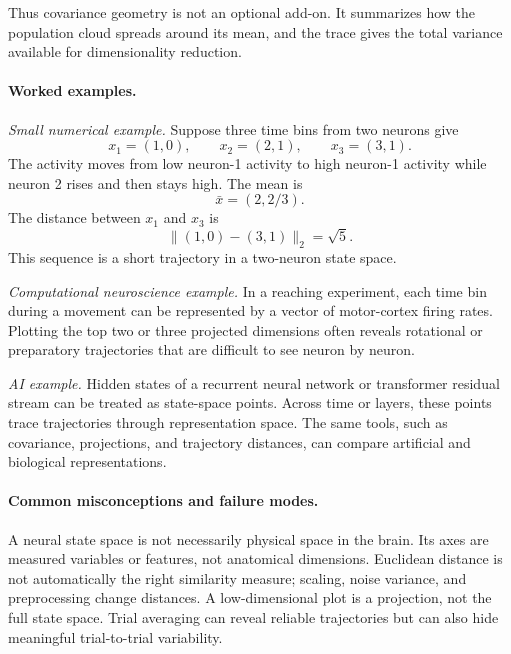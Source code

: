 Thus covariance geometry is not an optional add-on. It summarizes how the population cloud spreads around its mean, and the trace gives the total variance available for dimensionality reduction.

\paragraph{Worked examples.}
\emph{Small numerical example.}
Suppose three time bins from two neurons give
\[
x_1=(1,0),\qquad x_2=(2,1),\qquad x_3=(3,1).
\]
The activity moves from low neuron-1 activity to high neuron-1 activity while neuron 2 rises and then stays high. The mean is
\[
\bar x=(2,2/3).
\]
The distance between \(x_1\) and \(x_3\) is
\[
\|(1,0)-(3,1)\|_2=\sqrt{5}.
\]
This sequence is a short trajectory in a two-neuron state space.

\emph{Computational neuroscience example.}
In a reaching experiment, each time bin during a movement can be represented by a vector of motor-cortex firing rates. Plotting the top two or three projected dimensions often reveals rotational or preparatory trajectories that are difficult to see neuron by neuron.

\emph{AI example.}
Hidden states of a recurrent neural network or transformer residual stream can be treated as state-space points. Across time or layers, these points trace trajectories through representation space. The same tools, such as covariance, projections, and trajectory distances, can compare artificial and biological representations.

\paragraph{Common misconceptions and failure modes.}
A neural state space is not necessarily physical space in the brain. Its axes are measured variables or features, not anatomical dimensions. Euclidean distance is not automatically the right similarity measure; scaling, noise variance, and preprocessing change distances. A low-dimensional plot is a projection, not the full state space. Trial averaging can reveal reliable trajectories but can also hide meaningful trial-to-trial variability.


